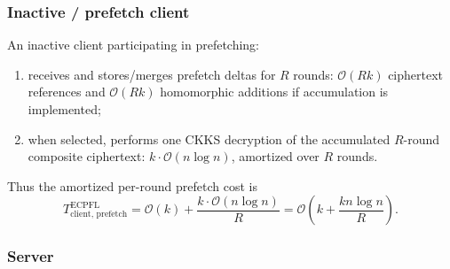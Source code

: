 \documentclass[a4paper,11pt]{article}
\begin{document}
\subsubsection{Inactive / prefetch client}
\label{sssec:ecpfl-inactive}

An inactive client participating in prefetching:
\begin{enumerate}
    \item receives and stores/merges prefetch deltas for $R$ rounds: $\mathcal{O}(Rk)$ ciphertext references and $\mathcal{O}(Rk)$ homomorphic additions if accumulation is implemented;
    \item when selected, performs one CKKS decryption of the accumulated $R$-round composite ciphertext: $k\cdot\mathcal{O}(n\log n)$, amortized over $R$ rounds.
\end{enumerate}
Thus the amortized per-round prefetch cost is
\begin{equation}
\boxed{T_{\text{client, prefetch}}^{\text{ECPFL}} = \mathcal{O}(k) + \frac{k\cdot\mathcal{O}(n\log n)}{R} = \mathcal{O}\!\left(k + \frac{k n\log n}{R}\right).}
\end{equation}

\subsubsection{Server}
\label{sssec:ecpfl-server}
\end{document}
